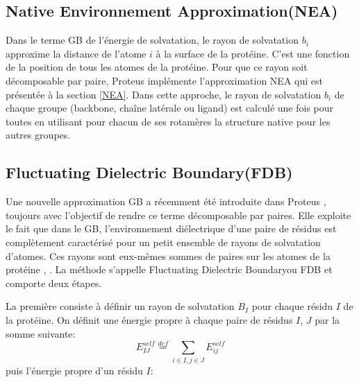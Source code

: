\subsection{\og Native Environnement Approximation\fg (NEA)}

Dans le terme GB de l'énergie de solvatation, le rayon de solvatation $b_i$ approxime la distance de l'atome $i$ à la surface de la protéine. C'est une fonction de la position de tous les atomes de la protéine. Pour que ce rayon soit décomposable par paire, Proteus implémente l'approximation  NEA qui est présentée à  la section \vref{NEA}. Dans cette approche, le rayon de solvatation $b_i$ de chaque groupe (backbone, chaîne latérale ou ligand) est calculé une fois pour toutes en utilisant pour chacun de ses rotamères la structure native pour les autres groupes.

\subsection{\og Fluctuating Dielectric Boundary\fg (FDB)}
\label{sec:FDB}
Une nouvelle approximation GB a récemment été introduite dans Proteus \cite{Villa17}, toujours avec l'objectif de rendre ce terme décomposable par paires. Elle exploite le fait que dans le GB, l'environnement diélectrique d'une paire de résidus est complètement caractérisé pour un petit ensemble de rayons de solvatation d'atomes. Ces rayons sont eux-mêmes sommes de paires sur les atomes de la protéine \cite{Hawkins95}, \cite{Schaefer96}. La méthode s'appelle Fluctuating Dielectric Boundary\fg ou FDB et comporte deux étapes.

La première consiste à définir un rayon de solvatation $B_I$ pour chaque résidu $I$ de la protéine. On définit une énergie propre à chaque paire de résidus $I$, $J$ par la somme suivante:
\begin{equation}
  E_{IJ}^{self} \stackrel{def}{=} \sum_{i\in I,j\in J} E_{ij}^{self}
\end{equation}
puis l'énergie propre d'un résidu $I$:

